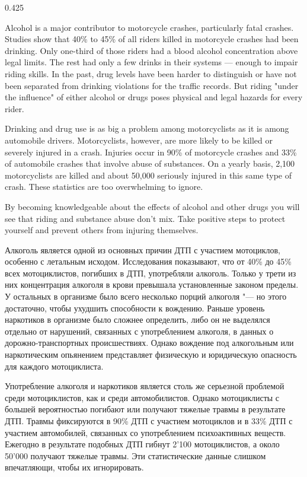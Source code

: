 \begin{langblock}{0.425}
	\begin{eng}
	
	Alcohol is a major contributor to motorcycle crashes, particularly fatal crashes. Studies show that 40\% to 45\% of all riders killed in motorcycle crashes had been drinking. Only one-third of those riders had a blood alcohol concentration above legal limits. The rest had only a few drinks in their  systems --- enough to impair riding skills. In the past, drug levels have been harder to distinguish or have not been separated from drinking violations for the traffic records. But riding "under the influence" of either alcohol or drugs poses physical and legal hazards for every rider.
	
	Drinking and drug use is as big a problem among motorcyclists as it is among automobile drivers.  Motorcyclists, however, are more likely to be killed or severely injured in a crash. Injuries occur in 90\% of motorcycle crashes and 33\% of automobile crashes that involve abuse of substances. On a yearly basis, 2,100 motorcyclists are killed and about 50,000 seriously injured in this same type of crash. These statistics are too overwhelming to ignore.
	
	
	By becoming knowledgeable about the effects of alcohol and other drugs you will see that riding and substance abuse don't mix. Take positive steps to protect yourself and prevent others from injuring themselves.
	\end{eng}
	\begin{rus}
		
		Алкоголь является одной из основных причин ДТП с участием мотоциклов, особенно с летальным исходом. Исследования показывают, что от 40\% до 45\% всех мотоциклистов, погибших в ДТП, употребляли алкоголь. Только у трети из них концентрация алкоголя в крови превышала установленные законом пределы. У остальных в организме было всего несколько порций алкоголя "--- но этого достаточно, чтобы ухудшить способности к вождению. Раньше уровень наркотиков в организме было сложнее определить, либо он не выделялся отдельно от нарушений, связанных с употреблением алкоголя, в данных о дорожно-транспортных происшествиях. Однако вождение под алкогольным или наркотическим опьянением представляет физическую и юридическую опасность для каждого мотоциклиста.
		
		Употребление алкоголя и наркотиков является столь же серьезной проблемой среди мотоциклистов, как и среди автомобилистов. Однако мотоциклисты с большей вероятностью погибают или получают тяжелые травмы в результате ДТП. Травмы фиксируются в 90\% ДТП с участием мотоциклов и в 33\% ДТП с участием автомобилей, связанных со употреблением психоактивных веществ. Ежегодно в результате подобных ДТП гибнут 2'100 мотоциклистов, а около 50'000 получают тяжелые травмы. Эти статистические данные слишком впечатляющи, чтобы их игнорировать.
		

\end{rus}
\end{langblock}
